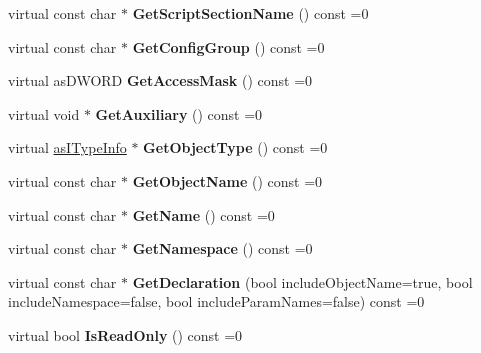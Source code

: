 \begin{DoxyCompactItemize}
virtual const char $\ast$ {\bfseries Get\+Script\+Section\+Name} () const =0
\item 
\mbox{\label{classas_i_script_function_afea841f0923573cea81467ac90b71996}} 
virtual const char $\ast$ {\bfseries Get\+Config\+Group} () const =0
\item 
\mbox{\label{classas_i_script_function_a5c49841eb92a0993a16eb855577b590c}} 
virtual as\+D\+W\+O\+RD {\bfseries Get\+Access\+Mask} () const =0
\item 
\mbox{\label{classas_i_script_function_acbdd97f1c3658cb4f82a154591e100f6}} 
virtual void $\ast$ {\bfseries Get\+Auxiliary} () const =0
\item 
\mbox{\label{classas_i_script_function_af930b362c37e5c4c117485d0bd4a34fb}} 
virtual \hyperlink{classas_i_type_info}{as\+I\+Type\+Info} $\ast$ {\bfseries Get\+Object\+Type} () const =0
\item 
\mbox{\label{classas_i_script_function_a69e30464d13867fb72e66ce3365fdec8}} 
virtual const char $\ast$ {\bfseries Get\+Object\+Name} () const =0
\item 
\mbox{\label{classas_i_script_function_a96cf134f1369f312aa182de5006f8b71}} 
virtual const char $\ast$ {\bfseries Get\+Name} () const =0
\item 
\mbox{\label{classas_i_script_function_ab692c00b9a7111778acb4fbca1c63df7}} 
virtual const char $\ast$ {\bfseries Get\+Namespace} () const =0
\item 
\mbox{\label{classas_i_script_function_a2fb021b09ae0e7e87f8fa4fdfd39df83}} 
virtual const char $\ast$ {\bfseries Get\+Declaration} (bool include\+Object\+Name=true, bool include\+Namespace=false, bool include\+Param\+Names=false) const =0
\item 
\mbox{\label{classas_i_script_function_a99bbe26ae0ec3f0cc09070bf89aff2f9}} 
virtual bool {\bfseries Is\+Read\+Only} () const =0
\item 
\mbox{\label{classas_i_script_function_a7ef1f42ff812a03e2a323046835159fb}} 

\end{DoxyCompactItemize}
